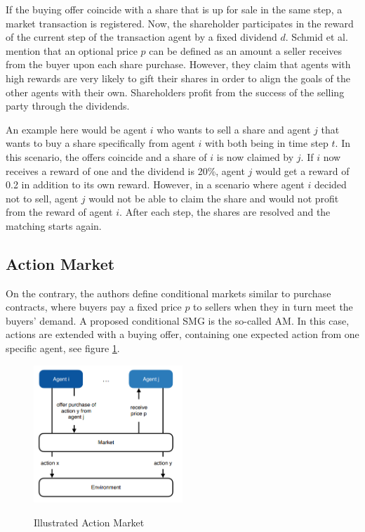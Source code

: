 If the buying offer coincide with a share that is up for sale in the same step, a market transaction is registered. Now, the shareholder participates in the reward of the current step of the transaction agent by a fixed dividend $d$. Schmid et al. mention that an optional price $p$ can be defined as an amount a seller receives from the buyer upon each share purchase. However, they claim that agents with high rewards are very likely to gift their shares in order to align the goals of the other agents with their own. Shareholders profit from the success of the selling party through the dividends.

An example here would be agent $i$ who wants to sell a share and agent $j$ that wants to buy a share specifically from agent $i$ with both being in time step $t$. In this scenario, the offers coincide and a share of $i$ is now claimed by $j$. If $i$ now receives a reward of one and the dividend is 20\%, agent $j$ would get a reward of 0.2 in addition to its own reward. However, in a scenario where agent $i$ decided not to sell, agent $j$ would not be able to claim the share and would not profit from the reward of agent $i$. After each step, the shares are resolved and the matching starts again.

\subsection{Action Market}
On the contrary, the authors define conditional markets similar to purchase contracts, where buyers pay a fixed price $p$ to sellers when they in turn meet the buyers' demand. A proposed conditional SMG is the so-called AM. In this case, actions are extended with a buying offer, containing one expected action from one specific agent, see figure \ref{fig:am}.

\begin{figure}[hpbt]
    \centering
    \includegraphics[width=0.5\textwidth]{pictures/SMG_am}\\
    \caption[Action Market]{Illustrated Action Market}\label{fig:am}
\end{figure}


